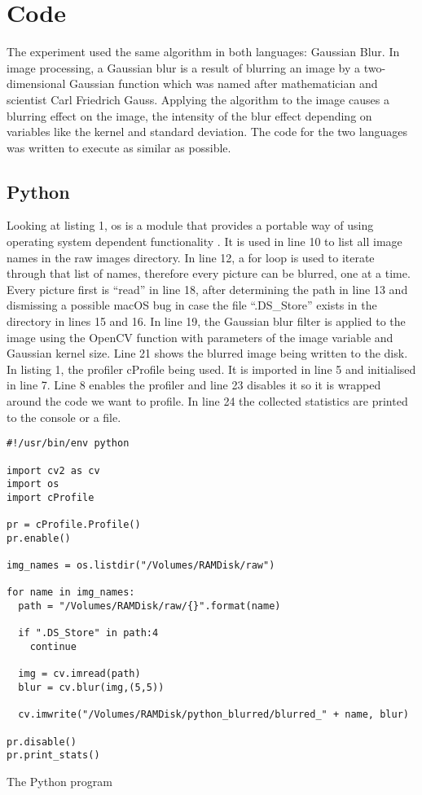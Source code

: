 \section{Code}
The experiment used the same algorithm in both languages: Gaussian Blur. In image processing, a Gaussian blur is a result of blurring an image by a two-dimensional Gaussian function which was named after mathematician and scientist Carl Friedrich Gauss. Applying the algorithm to the image causes a blurring effect on the image, the intensity of the blur effect depending on variables like the kernel and standard deviation. The code for the two languages was written to execute as similar as possible.

\subsection{Python}
Looking at listing 1, os is a module that provides a portable way of using operating system dependent functionality \cite{os}. It is used in line 10 to list all image names in the raw images directory. In line 12, a for loop is used to iterate through that list of names, therefore every picture can be blurred, one at a time. Every picture first is “read” in line 18, after determining the path in line 13 and dismissing a possible macOS bug in case the file “.DS\_Store” exists in the directory in lines 15 and 16. In line 19, the Gaussian blur filter is applied to the image using the OpenCV function with parameters of the image variable and Gaussian kernel size. Line 21 shows the blurred image being written to the disk.
In listing 1, the profiler cProfile being used. It is imported in line 5 and initialised in line 7. Line 8 enables the profiler and line 23 disables it so it is wrapped around the code we want to profile. In line 24 the collected statistics are printed to the console or a file.

\begin{listing}[H]
\begin{verbatim}
#!/usr/bin/env python

import cv2 as cv
import os
import cProfile

pr = cProfile.Profile()
pr.enable()

img_names = os.listdir("/Volumes/RAMDisk/raw")

for name in img_names:
  path = "/Volumes/RAMDisk/raw/{}".format(name)

  if ".DS_Store" in path:4
    continue

  img = cv.imread(path)
  blur = cv.blur(img,(5,5))

  cv.imwrite("/Volumes/RAMDisk/python_blurred/blurred_" + name, blur)

pr.disable()
pr.print_stats()
\end{verbatim}
\caption{The Python program}
\label{listing:python}
\end{listing}

